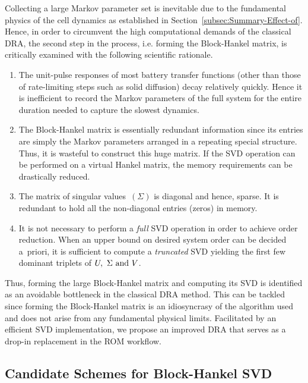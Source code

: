 Collecting a large Markov parameter set is inevitable due to the fundamental
physics of the cell dynamics as established in Section~\ref{subsec:Summary-Effect-of}.
Hence, in order to circumvent the high computational demands of the
classical DRA, the second step in the process, i.e. forming the Block-Hankel
matrix, is critically examined with the following scientific rationale.
\begin{enumerate}
	\item The unit-pulse responses of most battery transfer functions (other
	than those of rate-limiting steps such as solid diffusion) decay relatively
	quickly. Hence it is inefficient to record the Markov parameters of
	the full system for the entire duration needed to capture the slowest
	dynamics.
	\item The Block-Hankel matrix is essentially redundant information since
	its entries are simply the Markov parameters arranged in a repeating
	special structure. Thus, it is wasteful to construct this huge matrix.
	If the SVD operation can be performed on a virtual Hankel matrix,
	the memory requirements can be drastically reduced.
	\item The matrix of singular values~$\left(\Sigma\right)$ is diagonal
	and hence, sparse. It is redundant to hold all the non-diagonal entries
	(zeros) in memory.
	\item It is not necessary to perform a \textit{full} SVD operation in order
	to achieve order reduction. When an upper bound on desired system
	order can be decided a~priori, it is sufficient to compute a \textit{truncated}
	SVD yielding the first few dominant triplets of $U,\text{ \ensuremath{\Sigma}\ \text{and }}V$.
\end{enumerate}
Thus, forming the large Block-Hankel matrix and computing its SVD
is identified as an avoidable bottleneck in the classical DRA method.
This can be tackled since forming the Block-Hankel matrix is an idiosyncrasy
of the algorithm used and does not arise from any fundamental physical
limits. Facilitated by an efficient SVD implementation, we propose
an improved DRA that serves as a drop-in replacement in the ROM workflow.

\subsection{Candidate Schemes for Block-Hankel SVD}

\begin{figure*}
	\caption{}
	\label{improved_ROM_workflow}
\end{figure*}

